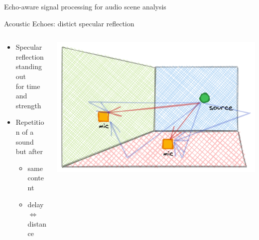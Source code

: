 \begin{frame}[t]{\alert{Echo-aware} signal processing for audio scene analysis}
\begin{mydefblock}{Acoustic Echoes: distict specular reflection}
        \vspace{-2mm}
        \begin{columns}[onlytextwidth]
            \begin{column}{0.58\textwidth}
                \begin{itemize}
                    \item Specular reflection standing out
                    \\for time and strength
                    \item Repetition of a sound but after
                    \begin{itemize}
                        \item same content
                        \item delay $\Leftrightarrow$ distance
                    \end{itemize}
                \end{itemize}
            \end{column}
            \begin{column}{0.40\textwidth}
                \centering
                \includegraphics[width=\textwidth]{figures/echoes}
            \end{column}

        \end{columns}
    \end{mydefblock}
\end{frame}


